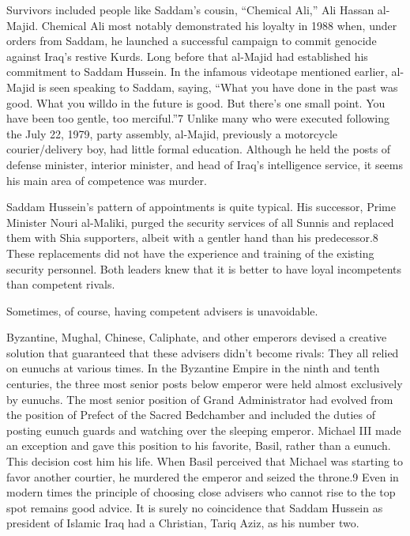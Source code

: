 \documentclass[10pt]{article}
\begin{document}
{\large Survivors included people like Saddam's cousin, ``Chemical Ali,'' Ali
Hassan al-Majid. Chemical Ali most notably demonstrated his loyalty in 1988 when,
under orders from Saddam, he launched a successful campaign to commit genocide
against Iraq's restive Kurds. Long before that al-Majid had established his
commitment to Saddam Hussein. In the infamous videotape mentioned earlier,
al-Majid is seen speaking to Saddam, saying, ``What you have done in the past was
good. What you willdo in the future is good. But there's one small point. You
have been too gentle, too merciful.''7 Unlike many who were executed following
the July 22, 1979, party assembly, al-Majid, previously a motorcycle
courier/delivery boy, had little formal education. Although he held the posts of
defense minister, interior minister, and head of Iraq's intelligence service, it
seems his main area of competence was murder.}

{\large Saddam Hussein's pattern of appointments is quite typical. His
successor, Prime Minister Nouri al-Maliki, purged the security services of all
Sunnis and replaced them with Shia supporters, albeit with a gentler hand than
his predecessor.8 These replacements did not have the experience and training of
the existing security personnel. Both leaders knew that it is better to have
loyal incompetents than competent rivals.}

{\large Sometimes, of course, having competent advisers is unavoidable.}

{\large Byzantine, Mughal, Chinese, Caliphate, and other emperors devised a
creative solution that guaranteed that these advisers didn't become rivals: They
all relied on eunuchs at various times. In the Byzantine Empire in the ninth and
tenth centuries, the three most senior posts below emperor were held almost
exclusively by eunuchs. The most senior position of Grand Administrator had
evolved from the position of Prefect of the Sacred Bedchamber and included the
duties of posting eunuch guards and watching over the sleeping emperor. Michael
III made an exception and gave this position to his favorite, Basil, rather than
a eunuch. This decision cost him his life. When Basil perceived that Michael was
starting to favor another courtier, he murdered the emperor and seized the
throne.9 Even in modern times the principle of choosing close advisers who cannot
rise to the top spot remains good advice. It is surely no coincidence that Saddam
Hussein as president of Islamic Iraq had a Christian, Tariq Aziz, as his number
two.}
\end{document}
